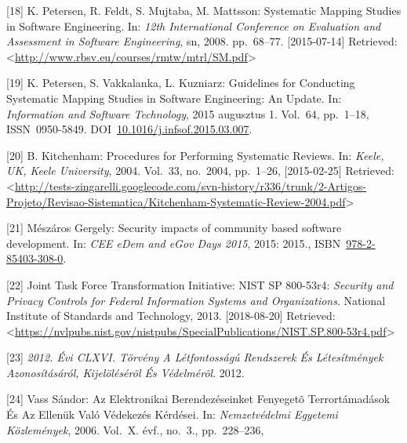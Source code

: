 \documentclass[12pt,magyar,a4paper,oneside]{scrreprt}
\begin{document}
\leavevmode\hypertarget{ref-petersen_systematic_2008}{}%
{[}18{]} K. Petersen, R. Feldt, S. Mujtaba, M. Mattsson: Systematic
Mapping Studies in Software Engineering. In: \emph{12th International
Conference on Evaluation and Assessment in Software Engineering}, sn,
2008. pp.~68--77. {[}2015-07-14{]} Retrieved:
\textless{}\url{http://www.rbsv.eu/courses/rmtw/mtrl/SM.pdf}\textgreater{}

\leavevmode\hypertarget{ref-petersen_guidelines_2015}{}%
{[}19{]} K. Petersen, S. Vakkalanka, L. Kuzniarz: Guidelines for
Conducting Systematic Mapping Studies in Software Engineering: An
Update. In: \emph{Information and Software Technology}, 2015 augusztus
1. Vol.~64, pp.~1--18, ISSN~0950-5849.
DOI~\href{https://doi.org/10.1016/j.infsof.2015.03.007}{10.1016/j.infsof.2015.03.007}.

\leavevmode\hypertarget{ref-kitchenham_procedures_2004}{}%
{[}20{]} B. Kitchenham: Procedures for Performing Systematic Reviews.
In: \emph{Keele, UK, Keele University}, 2004. Vol.~33, no.~2004,
pp.~1--26, {[}2015-02-25{]} Retrieved:
\textless{}\url{http://tests-zingarelli.googlecode.com/svn-history/r336/trunk/2-Artigos-Projeto/Revisao-Sistematica/Kitchenham-Systematic-Review-2004.pdf}\textgreater{}

\leavevmode\hypertarget{ref-meszaros_gergely_security_2015}{}%
{[}21{]} Mészáros Gergely: Security impacts of community based software
development. In: \emph{CEE e\textbar{}Dem and e\textbar{}Gov Days 2015},
2015: 2015.,
ISBN~\href{https://worldcat.org/isbn/978-2-85403-308-0}{978-2-85403-308-0}.

\leavevmode\hypertarget{ref-joint_task_force_transformation_initiative_security_2013}{}%
{[}22{]} Joint Task Force Transformation Initiative: NIST SP 800-53r4:
\emph{Security and Privacy Controls for Federal Information Systems and
Organizations}. National Institute of Standards and Technology, 2013.
{[}2018-08-20{]} Retrieved:
\textless{}\url{https://nvlpubs.nist.gov/nistpubs/SpecialPublications/NIST.SP.800-53r4.pdf}\textgreater{}

\leavevmode\hypertarget{ref-noauthor_2012._2012}{}%
{[}23{]} \emph{2012. Évi CLXVI. Törvény A Létfontosságú Rendszerek És
Létesítmények Azonosításáról, Kijelölésérõl És Védelmérõl}. 2012.

\leavevmode\hypertarget{ref-vass_sandor_az_2006}{}%
{[}24{]} Vass Sándor: Az Elektronikai Berendezéseinket Fenyegetõ
Terrortámadások És Az Ellenük Való Védekezés Kérdései. In:
\emph{Nemzetvédelmi Egyetemi Közlemények}, 2006. Vol.~X. évf., no.~3.,
pp.~228--236,
\end{document}
